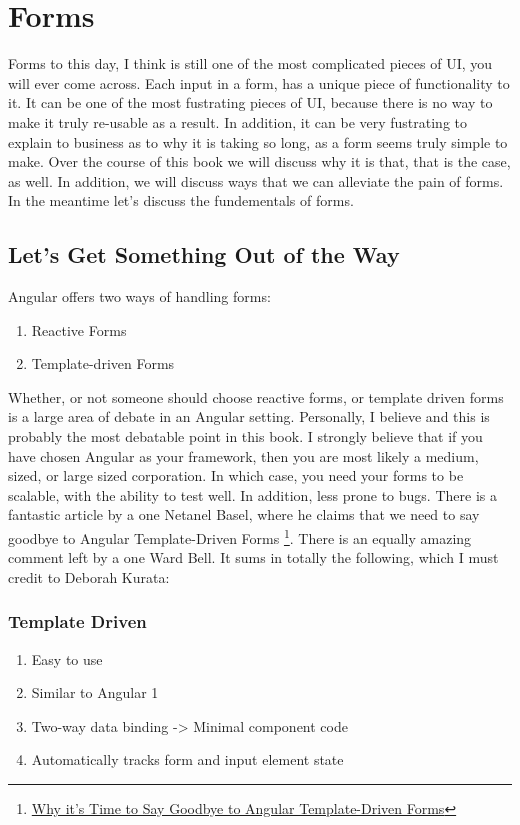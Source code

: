 
\section{ Forms }

Forms to this day, I think is still one of the most complicated pieces of UI,
you will ever come across. Each input in a form, has a unique piece of 
functionality to it. It can be one of the most fustrating pieces of UI, 
because there is no way to make it truly re-usable as a result. In 
addition, it can be very fustrating to explain to business as to why it is 
taking so long, as a form seems truly simple to make. Over the course of this 
book we will discuss why it is that, that is the case, as well. In addition,
we will discuss ways that we can alleviate the pain of forms. In the meantime 
let's discuss the fundementals of forms. 

\subsection{ Let's Get Something Out of the Way }

Angular offers two ways of handling forms: 
\begin{enumerate}
  \item Reactive Forms 
  \item Template-driven Forms
\end{enumerate}

Whether, or not someone should choose reactive forms, or template driven 
forms is a large area of debate in an Angular setting. Personally, I believe 
and this is probably the most debatable point in this book. I strongly 
believe that if you have chosen Angular as your framework, then you are most 
likely a medium, sized, or large sized corporation. In which case, you need 
your forms to be scalable, with the ability to test well. In addition, less 
prone to bugs. There is a fantastic article by a one Netanel Basel, where 
he claims that we need to say goodbye to Angular Template-Driven Forms
\footnote{\href{https://netbasal.com/why-its-time-to-say-goodbye-to-angular-template-driven-forms-350c11d004b}{Why it's Time to Say Goodbye to Angular Template-Driven Forms}}.
There is an equally amazing comment left by a one Ward Bell. It sums in totally the 
following, which I must credit to Deborah Kurata: 

\subsubsection{Template Driven}
\begin{enumerate}
  \item Easy to use
  \item Similar to Angular 1
  \item Two-way data binding -> Minimal component code
  \item Automatically tracks form and input element state
\end{enumerate}

